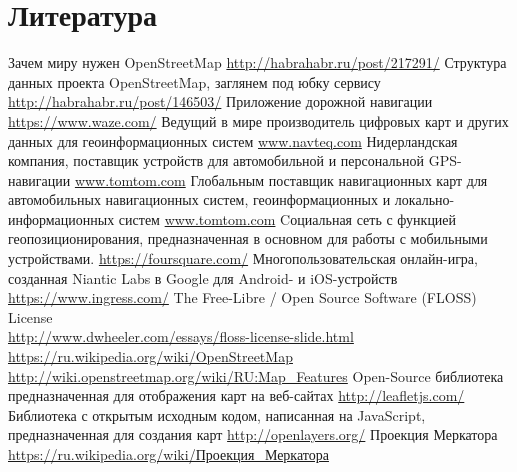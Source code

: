 \chapter{Литература}
\begin{thebibliography}{10}
     Зачем миру нужен OpenStreetMap 
        \url{http://habrahabr.ru/post/217291/}
     Структура данных проекта OpenStreetMap, заглянем под 
        юбку сервису \url{http://habrahabr.ru/post/146503/}
     Приложение дорожной навигации \url{https://www.waze.com/}
     Ведущий в мире производитель цифровых карт и других 
        данных для геоинформационных систем \url{www.navteq.com}
     Нидерландская компания, поставщик устройств для 
        автомобильной и персональной GPS-навигации \url{www.tomtom.com}
     Глобальным поставщик навигационных карт для 
        автомобильных навигационных систем, геоинформационных и 
        локально-информационных систем \url{www.tomtom.com}
     Cоциальная сеть с функцией геопозиционирования, 
        предназначенная в основном для работы с мобильными устройствами.
        \url{https://foursquare.com/}
     Многопользовательская онлайн-игра, созданная 
        Niantic Labs в Google для Android- и iOS-устройств 
        \url{https://www.ingress.com/}
     The Free-Libre / Open Source Software (FLOSS) License\\
        \url{http://www.dwheeler.com/essays/floss-license-slide.html}
     \url{https://ru.wikipedia.org/wiki/OpenStreetMap}
     \url{http://wiki.openstreetmap.org/wiki/RU:Map_Features}
     Open-Source библиотека предназначенная для отображения 
        карт на веб-сайтах \url{http://leafletjs.com/}
     Библиотека с открытым исходным кодом, написанная на 
        JavaScript, предназначенная для создания карт 
        \url{http://openlayers.org/}
     Проекция Меркатора 
        \href{https://ru.wikipedia.org/wiki/%D0%9F%D1%80%D0%BE%D0%B5%D0%BA%D1%86%D0%B8%D1%8F_%D0%9C%D0%B5%D1%80%D0%BA%D0%B0%D1%82%D0%BE%D1%80%D0%B0}
        {https://ru.wikipedia.org/wiki/Проекция\_Меркатора}
\end{thebibliography}
